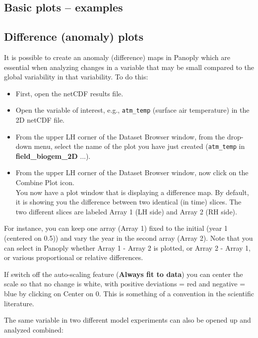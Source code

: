 \documentclass[11pt,fleqn]{book} %
\begin{document}

\subsection{Basic plots -- examples}


\subsection{Difference (anomaly) plots}

It is possible to create an anomaly (difference) maps in Panoply which are essential when analyzing changes in a variable that may be small compared to the global variability in that variability. To do this:  

\begin{itemize}
\item First, open the netCDF results file.
\item Open the variable of interest, e.g., \texttt{atm\_temp} (surface air temperature) in the 2D netCDF file. 
\item From the upper LH corner of the Dataset Browser window, from the drop-down menu, select the name of the plot you have just created (\texttt{atm\_temp} in \textbf{field\_biogem\_2D} ...).
\item From the upper LH corner of the Dataset Browser window, now click on the Combine Plot icon.
        \\ You now have a plot window that is displaying a difference map. By default, it is showing you the difference between two identical (in time) slices. The two different slices are labeled Array 1 (LH side) and Array 2 (RH side).
\end{itemize}

For instance, you can keep one array (Array 1) fixed to the initial (year 1 (centered on 0.5)) and vary the year in the second array (Array 2). Note that you can select in Panoply whether Array 1 - Array 2 is plotted, or Array 2 - Array 1, or various proportional or relative differences.

If switch off the auto-scaling feature (\textbf{Always fit to data}) you can center the scale so that no change is white, with positive deviations = red and negative = blue by clicking on Center on 0. This is something of a convention in the scientific literature.

The same variable in two different model experiments can also be opened up and analyzed combined: 
\end{document}
